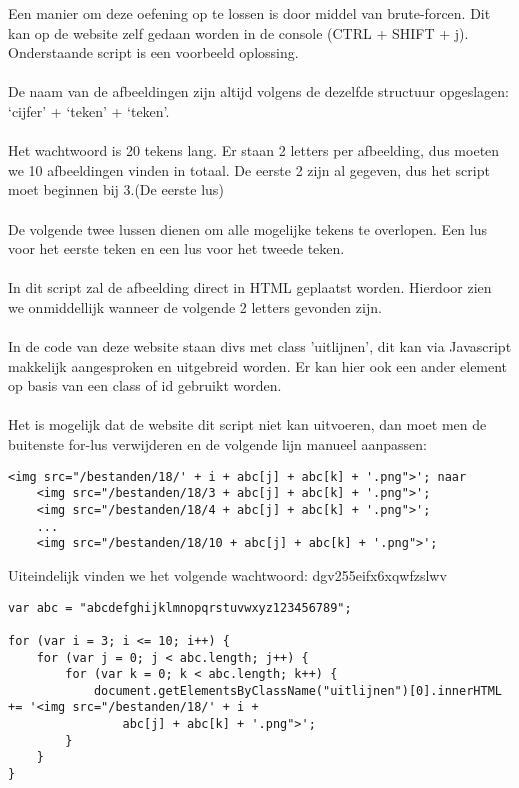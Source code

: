 Een manier om deze oefening op te lossen is door middel van brute-forcen. Dit kan op de website zelf gedaan worden in de console (CTRL + SHIFT + j). Onderstaande script is een voorbeeld oplossing.
\\\\
De naam van de afbeeldingen zijn altijd volgens de dezelfde structuur opgeslagen: `cijfer' + `teken' + `teken'.
\\\\
Het wachtwoord is 20 tekens lang. Er staan 2 letters per afbeelding, dus moeten we 10 afbeeldingen vinden in totaal. De eerste 2 zijn al gegeven, dus het script moet beginnen bij 3.(De eerste lus)
\\\\
De volgende twee lussen dienen om alle mogelijke tekens te overlopen. Een lus voor het eerste teken en een lus voor het tweede teken.
\\\\
In dit script zal de afbeelding direct in HTML geplaatst worden. Hierdoor zien we onmiddellijk wanneer de volgende 2 letters gevonden zijn.
\\\\
In de code van deze website staan divs met class 'uitlijnen', dit kan via Javascript makkelijk aangesproken en uitgebreid worden. Er kan hier ook een ander element op basis van een class of id gebruikt worden.
\\\\
Het is mogelijk dat de website dit script niet kan uitvoeren, dan moet men de buitenste for-lus verwijderen en de volgende lijn manueel aanpassen:
\begin{lstlisting}
<img src="/bestanden/18/' + i + abc[j] + abc[k] + '.png">'; naar
	<img src="/bestanden/18/3 + abc[j] + abc[k] + '.png">';
	<img src="/bestanden/18/4 + abc[j] + abc[k] + '.png">';
	...
	<img src="/bestanden/18/10 + abc[j] + abc[k] + '.png">';
\end{lstlisting}

Uiteindelijk vinden we het volgende wachtwoord: dgv255eifx6xqwfzslwv

\begin{lstlisting}
var abc = "abcdefghijklmnopqrstuvwxyz123456789";

for (var i = 3; i <= 10; i++) {
	for (var j = 0; j < abc.length; j++) {
		for (var k = 0; k < abc.length; k++) {
			document.getElementsByClassName("uitlijnen")[0].innerHTML += '<img src="/bestanden/18/' + i + 
				abc[j] + abc[k] + '.png">';
		}
	}
}
\end{lstlisting}
